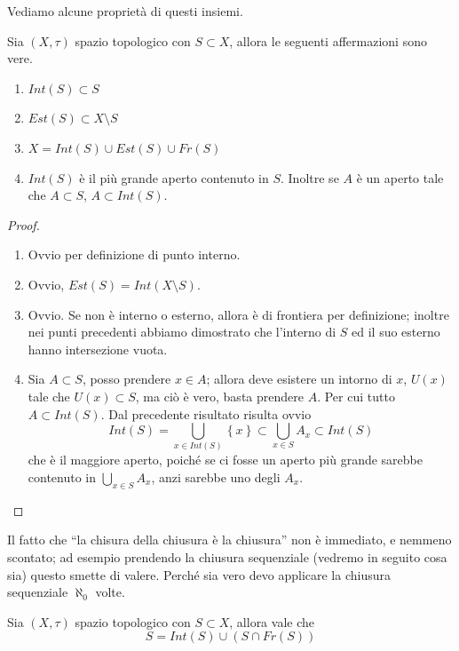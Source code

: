 Vediamo alcune proprietà di questi insiemi.

\begin{proposition}
	Sia $(X,\tau)$ spazio topologico con $S \subset X$, allora le seguenti affermazioni sono vere.
	\begin{enumerate}
		\item $Int(S) \subset S$
		\item $Est(S) \subset X \setminus S$
		\item $X = Int(S) \cup Est(S) \cup Fr(S)$ 
		\item $Int(S)$ è il più grande aperto contenuto in $S$. Inoltre se $A$ è un aperto tale che $A \subset S$, $A \subset Int(S)$.	
	\end{enumerate}
\end{proposition}
\begin{proof} \
	\begin{enumerate}
		\item Ovvio per definizione di punto interno.
		\item Ovvio, $Est(S)=Int(X\setminus S)$.
		\item Ovvio. Se non è interno o esterno, allora è di frontiera per definizione; inoltre nei punti precedenti abbiamo dimostrato che l'interno di $S$ ed il suo esterno hanno intersezione vuota.
		\item Sia $A \subset S$, posso prendere $x \in A$; allora deve esistere un intorno di $x$, $U(x)$ tale che $U(x) \subset S$, ma ciò è vero, basta prendere $A$. Per cui tutto $A \subset Int(S)$. Dal precedente risultato risulta ovvio
		\begin{equation*}
			Int(S) = \bigcup_{x\in Int(S)} \left\{x\right\} \subset \bigcup_{x \in S} A_x \subset Int(S) 
		\end{equation*}
		che è il maggiore aperto, poiché se ci fosse un aperto più grande sarebbe contenuto in $\bigcup_{x \in S} A_x$, anzi sarebbe uno degli $A_x$.
	\end{enumerate}
\end{proof}

Il fatto che \enquote{la chisura della chiusura è la chiusura} non è immediato, e nemmeno scontato; ad esempio prendendo la chiusura sequenziale (vedremo in seguito cosa sia) questo smette di valere. Perché sia vero devo applicare la chiusura sequenziale $\aleph_0$ volte.

\begin{theorem}
	\label{thr:set_decomposition_inner_frontier}
	Sia $(X,\tau)$ spazio topologico con $S \subset X$, allora vale che
	\begin{equation*}
	S = Int(S) \cup (S \cap Fr(S))
	\end{equation*}
\end{theorem}

